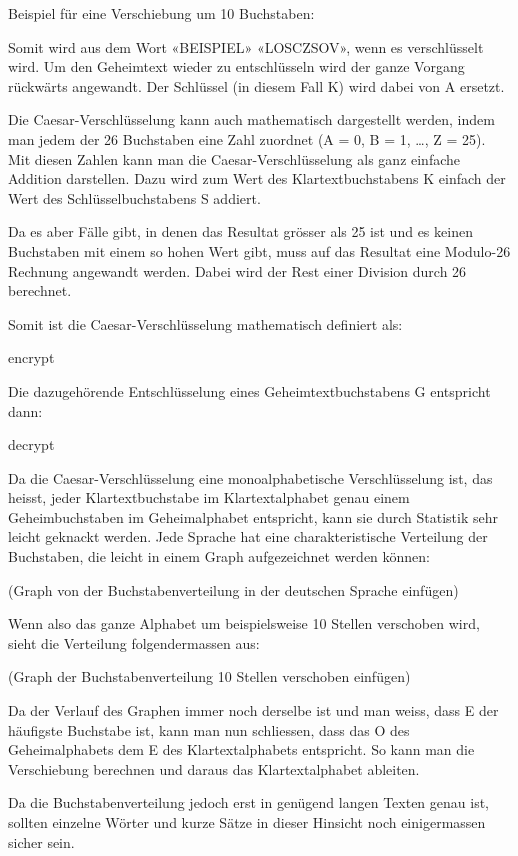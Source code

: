 Beispiel für eine Verschiebung um 10 Buchstaben:

Somit wird aus dem Wort «BEISPIEL» «LOSCZSOV», wenn es verschlüsselt wird. Um den Geheimtext wieder zu entschlüsseln wird der ganze Vorgang rückwärts angewandt. Der Schlüssel (in diesem Fall K) wird dabei von A ersetzt.

Die Caesar-Verschlüsselung kann auch mathematisch dargestellt werden, indem man jedem der 26 Buchstaben eine Zahl zuordnet (A = 0, B = 1, …, Z = 25). Mit diesen Zahlen kann man die Caesar-Verschlüsselung als ganz einfache Addition darstellen. Dazu wird zum Wert des Klartextbuchstabens K einfach der Wert des Schlüsselbuchstabens S addiert.

Da es aber Fälle gibt, in denen das Resultat grösser als 25 ist und es keinen Buchstaben mit einem so hohen Wert gibt, muss auf das Resultat eine Modulo-26 Rechnung angewandt werden. Dabei wird der Rest einer Division durch 26 berechnet.

Somit ist die Caesar-Verschlüsselung mathematisch definiert als:

encrypt

Die dazugehörende Entschlüsselung eines Geheimtextbuchstabens G entspricht dann:

decrypt

Da die Caesar-Verschlüsselung eine monoalphabetische Verschlüsselung ist, das heisst, jeder Klartextbuchstabe im Klartextalphabet genau einem Geheimbuchstaben im Geheimalphabet entspricht, kann sie durch Statistik sehr leicht geknackt werden.
Jede Sprache hat eine charakteristische Verteilung der Buchstaben, die leicht in einem Graph aufgezeichnet werden können:

(Graph von der Buchstabenverteilung in der deutschen Sprache einfügen)

Wenn also das ganze Alphabet um beispielsweise 10 Stellen verschoben wird, sieht die Verteilung folgendermassen aus:

(Graph der Buchstabenverteilung 10 Stellen verschoben einfügen)

Da der Verlauf des Graphen immer noch derselbe ist und man weiss, dass E der häufigste Buchstabe ist, kann man nun schliessen, dass das O des Geheimalphabets dem E des Klartextalphabets entspricht. So kann man die Verschiebung berechnen und daraus das Klartextalphabet ableiten.

Da die Buchstabenverteilung jedoch erst in genügend langen Texten genau ist, sollten einzelne Wörter und kurze Sätze in dieser Hinsicht noch einigermassen sicher sein.

